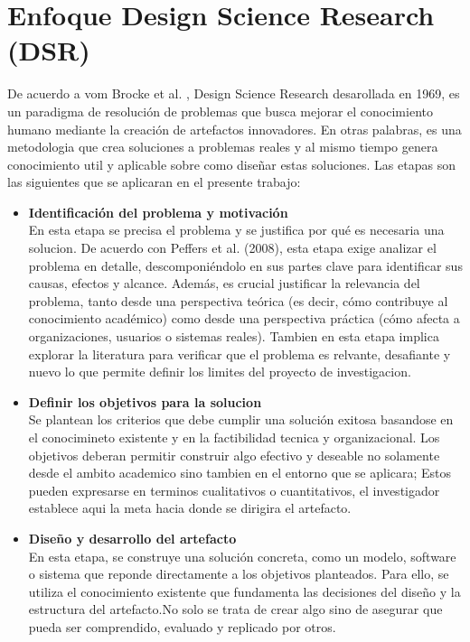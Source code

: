 \section{Enfoque Design Science Research (DSR)}
De acuerdo a vom Brocke et al. \cite{vomBrocke2020}, Design Science Research desarollada en 1969, es un paradigma de resolución de problemas que busca mejorar el 
conocimiento humano mediante la creación de artefactos innovadores. En otras palabras, es una metodologia que crea soluciones a problemas  reales y al mismo tiempo genera
conocimiento util y aplicable sobre como diseñar estas soluciones. Las etapas son las siguientes que se aplicaran en el presente trabajo: 
\begin{itemize}[align=left, label=--]
    \item \textbf{Identificación del problema y motivación} \\
    En esta etapa se precisa el problema y se justifica por qué es necesaria una solucion. De acuerdo con Peffers et al. (2008), esta etapa exige analizar el problema en detalle, descomponiéndolo en sus partes clave para identificar sus causas, efectos y alcance. Además, es crucial justificar la relevancia del problema, tanto desde una perspectiva teórica (es decir, cómo contribuye al conocimiento académico) como desde una perspectiva práctica (cómo afecta a organizaciones, usuarios o sistemas reales). 
    Tambien en esta etapa implica explorar la literatura para verificar que el problema es relvante, desafiante y nuevo lo que 
    permite definir los limites del proyecto de investigacion.
    \item \textbf{Definir los objetivos para la solucion}\\
    Se plantean los criterios que debe cumplir una solución exitosa basandose en el conocimineto existente y en la factibilidad tecnica y organizacional.
    Los objetivos deberan permitir construir algo efectivo y deseable no solamente desde el ambito academico sino tambien en el entorno que se aplicara; Estos pueden expresarse en terminos cualitativos o cuantitativos, el investigador establece aqui la meta hacia donde se dirigira el artefacto.
    \item \textbf{Diseño y desarrollo del artefacto}\\
    En esta etapa, se construye una solución concreta, como un modelo, software o sistema
    que reponde directamente a los objetivos planteados. Para ello, se utiliza el conocimiento existente que fundamenta las decisiones del diseño y la estructura del artefacto.No solo se trata de crear algo sino de asegurar que pueda ser comprendido, evaluado y replicado por otros.

\end{itemize}
